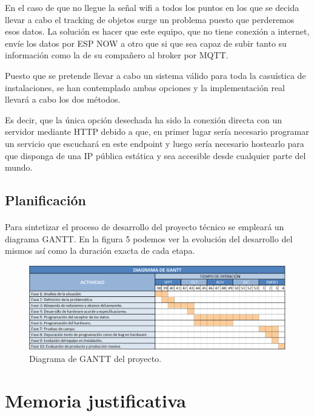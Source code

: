 \documentclass[paper=a4, fontsize=11pt,twoside]{scrartcl}	%
\begin{document}
        En el caso de que no llegue la señal wifi a todos los puntos en los que se decida llevar a cabo el tracking de objetos 
        surge un problema puesto que perderemos esos datos. La solución es hacer que este equipo, que no tiene conexión a internet,
        envíe los datos por ESP NOW a otro que si que sea capaz de subir tanto su información como la de su compañero al broker por MQTT.

        Puesto que se pretende llevar a cabo un sistema válido para toda la casuística de instalaciones, se han contemplado ambas opciones
        y la implementación real llevará a cabo los dos métodos.
        
        Es decir, que la única opción desechada ha sido la conexión directa con un servidor mediante HTTP debido a que, en primer
        lugar sería necesario programar un servicio que escuchará en este endpoint y luego sería necesario hostearlo 
        para que disponga de una IP pública estática y sea accesible desde cualquier parte del mundo.
    \subsection{Planificación}
        \paragraph{}
        Para sintetizar el proceso de desarrollo del proyecto técnico se empleará un diagrama GANTT. En la
        figura 5 podemos ver la evolución del desarrollo del mismos así como la duración exacta de cada etapa. 
        \begin{center}
            \begin{figure}[ht]
                \centering
                \includegraphics[width=1\textwidth]{diagrama de gantt.PNG}
                \caption{Diagrama de GANTT del proyecto.}
                \label{fig:mesh18}
            \end{figure}
        \end{center} 
\section{Memoria justificativa}
\end{document}
